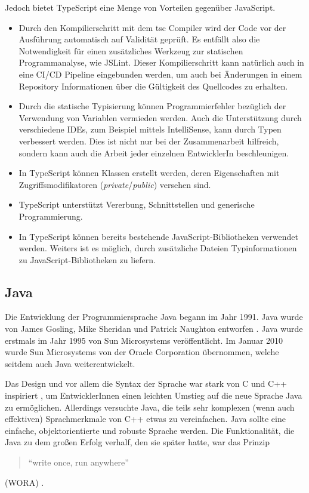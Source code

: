 Jedoch bietet TypeScript eine Menge von Vorteilen 
gegenüber JavaScript.
\begin{itemize}
  \item Durch den Kompilierschritt mit dem tsc Compiler wird der 
    Code vor der Ausführung automatisch auf Validität geprüft. 
    Es entfällt also die Notwendigkeit für einen zusätzliches Werkzeug 
    zur statischen Programmanalyse, wie JSLint. 
    Dieser Kompilierschritt kann natürlich auch in eine 
    CI/CD Pipeline eingebunden werden, um auch bei Änderungen in einem
    Repository Informationen über die Gültigkeit des Quellcodes zu erhalten.
  \item Durch die statische Typisierung können Programmierfehler bezüglich
    der Verwendung von Variablen vermieden werden. Auch die Unterstützung 
    durch verschiedene IDEs, zum Beispiel mittels IntelliSense, kann durch 
    Typen verbessert werden. Dies ist nicht nur bei der Zusammenarbeit hilfreich, 
    sondern kann auch die Arbeit jeder einzelnen EntwicklerIn beschleunigen.
  \item In TypeScript können Klassen erstellt werden, deren Eigenschaften mit 
    Zugriffsmodifikatoren (\emph{private}/\emph{public}) versehen sind.
  \item TypeScript unterstützt Vererbung, Schnittstellen und generische Programmierung.
  \item In TypeScript können bereits bestehende JavaScript-Bibliotheken 
    verwendet werden. Weiters ist es möglich, durch zusätzliche Dateien 
    Typinformationen zu \linebreak
    JavaScript-Bibliotheken zu liefern.
\end{itemize}

\subsection{Java}

Die Entwicklung der Programmiersprache Java begann im Jahr 1991. Java 
wurde von James Gosling, Mike Sheridan und Patrick Naughton entworfen \cite{WinnieDoug2021EJfA}.
Java wurde erstmals im Jahr 1995 von Sun Microsystems veröffentlicht. 
Im Januar 2010 wurde Sun Microsystems von der Oracle Corporation übernommen, 
welche seitdem auch Java weiterentwickelt.

Das Design und vor allem die Syntax der Sprache war stark von C und C++ inspiriert \cite{ArnoldKen1996TJpl}, 
um EntwicklerInnen einen leichten Umstieg auf die neue Sprache Java zu ermöglichen. 
Allerdings versuchte Java, die teils sehr komplexen (wenn auch effektiven) 
Sprachmerkmale von C++ etwas zu vereinfachen. Java sollte eine einfache, objektorientierte 
und robuste Sprache werden. Die Funktionalität, die Java zu dem großen Erfolg verhalf, 
den sie später hatte, war das Prinzip
\begin{quote}\begin{english}\enquote{write once, run anywhere}\end{english}\end{quote}
(WORA) \cite{SharanKishori2022BJ1f}. 

